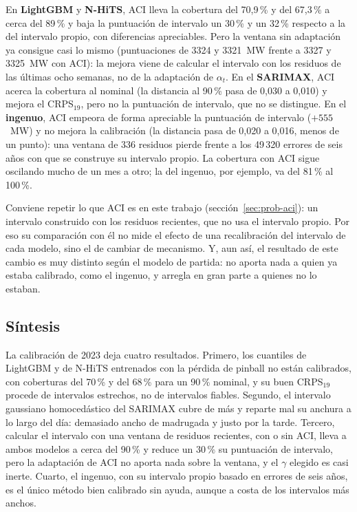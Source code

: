 En \textbf{LightGBM} y \textbf{N-HiTS}, ACI lleva la cobertura del 70,9\,\% y del
67,3\,\% a cerca del 89\,\% y baja la puntuación de intervalo un 30\,\% y un
32\,\% respecto a la del intervalo propio, con diferencias apreciables. Pero la
ventana sin adaptación ya consigue casi lo mismo (puntuaciones de 3324 y
3321~MW frente a 3327 y 3325~MW con ACI): la mejora viene de calcular el
intervalo con los residuos de las últimas ocho semanas, no de la adaptación de
$\alpha_t$. En el \textbf{SARIMAX}, ACI acerca la cobertura al nominal (la
distancia al 90\,\% pasa de 0,030 a 0,010) y mejora el CRPS$_{19}$, pero no la
puntuación de intervalo, que no se distingue. En el \textbf{ingenuo}, ACI
empeora de forma apreciable la puntuación de intervalo ($+555$~MW) y no mejora
la calibración (la distancia pasa de 0,020 a 0,016, menos de un punto): una
ventana de 336 residuos pierde frente a los 49\,320 errores de seis años con que
se construye su intervalo propio. La cobertura con ACI sigue oscilando mucho de
un mes a otro; la del ingenuo, por ejemplo, va del 81\,\% al 100\,\%.

Conviene repetir lo que ACI es en este trabajo (sección~\ref{sec:prob-aci}):
un intervalo construido con los residuos recientes, que no usa el intervalo
propio. Por eso su comparación con él no mide el efecto de una recalibración del
intervalo de cada modelo, sino el de cambiar de mecanismo. Y, aun así, el
resultado de este cambio es muy distinto según el modelo de partida: no aporta
nada a quien ya estaba calibrado, como el ingenuo, y arregla en gran parte a
quienes no lo estaban.

\subsection{Síntesis}\label{sec:cal-sintesis}

La calibración de 2023 deja cuatro resultados. Primero, los cuantiles de
LightGBM y de N-HiTS entrenados con la pérdida de pinball no están calibrados,
con coberturas del 70\,\% y del 68\,\% para un 90\,\% nominal, y su buen
CRPS$_{19}$ procede de intervalos estrechos, no de intervalos fiables. Segundo,
el intervalo gaussiano homocedástico del SARIMAX cubre de más y reparte mal su
anchura a lo largo del día: demasiado ancho de madrugada y justo por la tarde.
Tercero, calcular el intervalo con una ventana de residuos recientes, con o sin
ACI, lleva a ambos modelos a cerca del 90\,\% y reduce un 30\,\% su
puntuación de intervalo, pero la adaptación de ACI no aporta nada sobre la
ventana, y el $\gamma$ elegido es casi inerte. Cuarto, el ingenuo, con su
intervalo propio basado en errores de seis años, es el único método bien
calibrado sin ayuda, aunque a costa de los intervalos más anchos.

